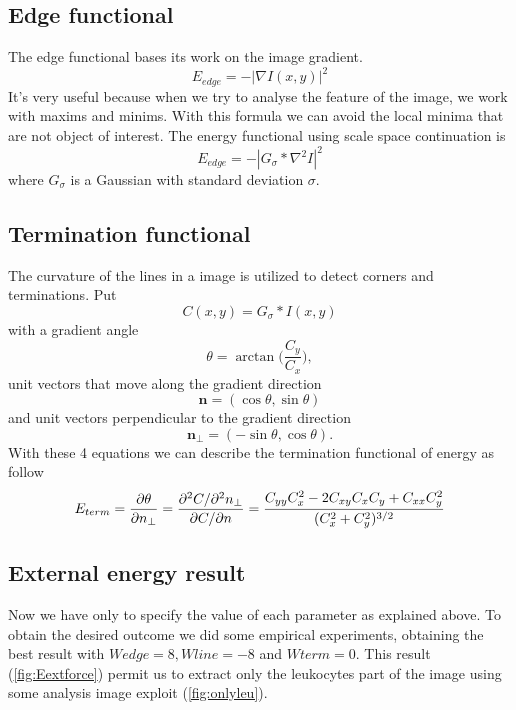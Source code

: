 \subsection{Edge functional}
The edge functional bases its work on the image gradient.
\begin{equation}
E_{{edge}}=-\left|\nabla I(x,y)\right\vert ^{2}
\end{equation}
It's very useful because when we try to analyse the feature of the image, we work with maxims and minims. With this formula we can avoid the local minima that are not object of interest. The energy functional using scale space continuation is
\begin{equation}
E_{edge}=-\left|G_{\sigma }*\nabla ^{2}I\right\vert ^{2}
\end{equation}
where $ G_{\sigma } $ is a Gaussian with standard deviation $ \sigma $.

\subsection{Termination functional}
The curvature of the lines in a image is utilized to detect corners and terminations. Put 
\begin{equation}
C(x,y)=G_{{\sigma }}*I(x,y)
\end{equation}
with a gradient angle
\begin{equation}
\theta =\arctan {\Bigg (}{\frac  {C_{y}}{C_{x}}}{\Bigg )},
\end{equation}
unit vectors that move along the gradient direction 
\begin{equation}
{\mathbf  n}=(\cos \theta ,\sin \theta )
\end{equation}
and unit vectors perpendicular to the gradient direction
\begin{equation}
{\mathbf  n}_{{\perp }}=(-\sin \theta ,\cos \theta ).
\end{equation}
With these 4 equations we can describe the termination functional of energy as follow
\begin{equation}
E_{{term}}={\partial \theta  \over \partial n_{{\perp }}}={\partial ^{2}C/\partial ^{2}n_{{\perp }} \over \partial C/\partial n}={{C_{{yy}}C_{x}^{2}-2C_{{xy}}C_{x}C_{y}+C_{{xx}}C_{y}^{2}} \over (C_{x}^{2}+C_{y}^{2})^{{3/2}}}
\end{equation}

\subsection{External energy result}
Now we have only to specify the value of each parameter as explained above.
To obtain the desired outcome we did some empirical experiments, obtaining the best result with $ Wedge=8, Wline=-8 $ and $ Wterm=0$. This result (\ref{fig:Eextforce}) permit us to extract only the leukocytes part of the image using some analysis image exploit (\ref{fig:onlyleu}).

